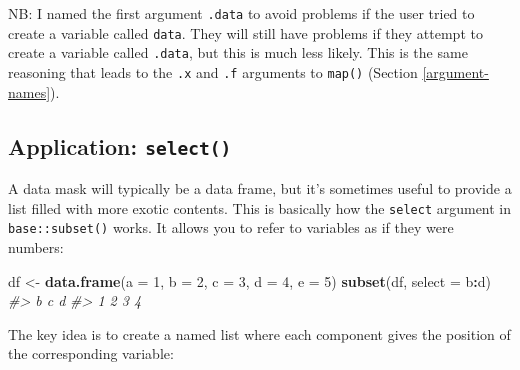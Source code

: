 \documentclass[]{book}
\makeatletter
\newenvironment{Shaded}{\begin{snugshade}}{\end{snugshade}}
\newcommand{\CommentTok}[1]{\textcolor[rgb]{0.37,0.37,0.37}{\textit{#1}}}
\newcommand{\DataTypeTok}[1]{\textcolor[rgb]{0.27,0.27,0.27}{#1}}
\newcommand{\DecValTok}[1]{\textcolor[rgb]{0.06,0.06,0.06}{#1}}
\newcommand{\KeywordTok}[1]{\textcolor[rgb]{0.27,0.27,0.27}{\textbf{#1}}}
\newcommand{\NormalTok}[1]{#1}
\newcommand{\OperatorTok}[1]{\textcolor[rgb]{0.43,0.43,0.43}{\textbf{#1}}}
\newcommand{\StringTok}[1]{\textcolor[rgb]{0.5,0.5,0.5}{#1}}
\newcommand{\indexc}[1]{\index{#1@\texttt{#1}}}
\makeatother
\begin{document}
NB: I named the first argument \texttt{.data} to avoid problems if the user tried to create a variable called \texttt{data}. They will still have problems if they attempt to create a variable called \texttt{.data}, but this is much less likely. This is the same reasoning that leads to the \texttt{.x} and \texttt{.f} arguments to \texttt{map()} (Section \ref{argument-names}).

\hypertarget{select}{%
\subsection{\texorpdfstring{Application: \texttt{select()}}{Application: select()}}\label{select}}

\indexc{select()}

A data mask will typically be a data frame, but it's sometimes useful to provide a list filled with more exotic contents. This is basically how the \texttt{select} argument in \texttt{base::subset()} works. It allows you to refer to variables as if they were numbers:

\begin{Shaded}
\begin{Highlighting}[]
\NormalTok{df <-}\StringTok{ }\KeywordTok{data.frame}\NormalTok{(}\DataTypeTok{a =} \DecValTok{1}\NormalTok{, }\DataTypeTok{b =} \DecValTok{2}\NormalTok{, }\DataTypeTok{c =} \DecValTok{3}\NormalTok{, }\DataTypeTok{d =} \DecValTok{4}\NormalTok{, }\DataTypeTok{e =} \DecValTok{5}\NormalTok{)}
\KeywordTok{subset}\NormalTok{(df, }\DataTypeTok{select =}\NormalTok{ b}\OperatorTok{:}\NormalTok{d)}
\CommentTok{#>   b c d}
\CommentTok{#> 1 2 3 4}
\end{Highlighting}
\end{Shaded}

The key idea is to create a named list where each component gives the position of the corresponding variable:

\begin{Shaded}
\end{Shaded}
\end{document}
